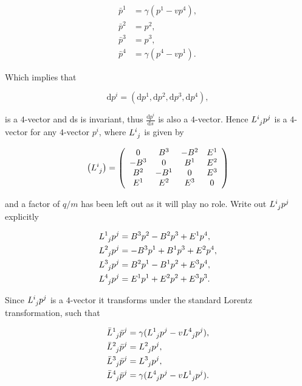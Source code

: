 \begin{appendix}
\begin{align*}
\bar{p}^1 & = \gamma (p^1 - v p^4),\\
\bar{p}^2 & = p^2, \\
\bar{p}^3 & = p^3,\\
\bar{p}^4 & = \gamma (p^4 - v p^1).
\end{align*}

\noindent Which implies that 

\begin{equation*}
\mathrm{d}p^i = (\mathrm{d}p^1,\mathrm{d}p^2,\mathrm{d}p^3,\mathrm{d}p^4),
\end{equation*}

\noindent is a $4$-vector and ds is invariant, thus $\frac{\mathrm{d}p^i}{\mathrm{d}s}$ is also a $4$-vector. Hence $\tensor{L}{^i_j} p^j$ is a $4$-vector for any $4$-vector $p^i$, where $\tensor{L}{^i_j}$ is given by

\begin{equation*}
\left( \tensor{L}{^i_j} \right) = 
\left(
\begin{array}{cccc}
0    & B^3  & -B^2 & E^1 \\
-B^3 & 0    & B^1  & E^2 \\
B^2  & -B^1 & 0    & E^3 \\
E^1  & E^2  & E^3  & 0   \\
\end{array}
\right)
\end{equation*}

\noindent and a factor of $q/m$ has been left out as it will play no role. Write out $\tensor{L}{^i_j} p^j$ explicitly

\begin{align*}
\tensor{L}{^1_j}p^j & = B^3 p^2 - B^2 p^3 + E^1 p^4, \\
\tensor{L}{^2_j}p^j & = -B^3 p^1 + B^1 p^3 + E^2 p^4, \\
\tensor{L}{^3_j}p^j & = B^2 p^1 - B^1 p^2 + E^3 p^4, \\
\tensor{L}{^4_j}p^j & = E^1 p^1 + E^2p^2 + E^3 p^3.
\end{align*}

\noindent Since $\tensor{L}{^i_j} p^j$ is a $4$-vector it transforms under the standard Lorentz transformation, such that

\begin{align}
\label{Appendix_Lp_Standard_Transform_a}
\tensor{\bar{L}}{^1_j}\bar{p}^j & = \gamma (\tensor{L}{^1_j}p^j - v \tensor{L}{^4_j}p^j),
\\\label{Appendix_Lp_Standard_Transform_b}
\tensor{\bar{L}}{^2_j}\bar{p}^j & = \tensor{L}{^2_j}p^j,
\\\label{Appendix_Lp_Standard_Transform_c}
\tensor{\bar{L}}{^3_j}\bar{p}^j & = \tensor{L}{^3_j}p^j,
\\\label{Appendix_Lp_Standard_Transform_d}
\tensor{\bar{L}}{^4_j}\bar{p}^j & = \gamma(\tensor{L}{^4_j}p^j - v \tensor{L}{^1_j}p^j).
\end{align}


\end{appendix}
